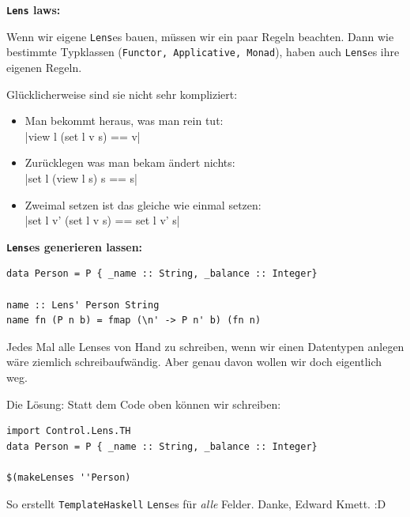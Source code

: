\documentclass{beamer}
\begin{document}

\begin{frame}[fragile]
\textbf{\texttt{Lens} laws:}
\smallskip

Wenn wir eigene \texttt{Lens}es bauen, müssen wir ein paar Regeln beachten. Dann wie bestimmte
Typklassen (\texttt{Functor, Applicative, Monad}), haben auch \texttt{Lens}es ihre eigenen Regeln.\pause
\bigskip

Glücklicherweise sind sie nicht sehr kompliziert:
\begin{itemize}
\item Man bekommt heraus, was man rein tut:\\
|view l (set l v s)  == v|
\pause
\item Zurücklegen was man bekam ändert nichts:\\
|set l (view l s) s  == s|
\pause
\item Zweimal setzen ist das gleiche wie einmal setzen:\\
|set l v' (set l v s) == set l v' s|
\end{itemize}

\end{frame}


\begin{frame}[fragile]

\textbf{\texttt{Lens}es generieren lassen:}\smallskip

\begin{verbatim}
data Person = P { _name :: String, _balance :: Integer}

name :: Lens' Person String
name fn (P n b) = fmap (\n' -> P n' b) (fn n)
\end{verbatim}

Jedes Mal alle Lenses von Hand zu schreiben, wenn wir einen Datentypen anlegen
wäre ziemlich schreibaufwändig. Aber genau davon wollen wir doch eigentlich weg.
\pause

Die Lösung: Statt dem Code oben können wir schreiben:

\begin{verbatim}
import Control.Lens.TH
data Person = P { _name :: String, _balance :: Integer}

$(makeLenses ''Person)
\end{verbatim}

So erstellt \texttt{TemplateHaskell} \texttt{Lens}es für \emph{alle} Felder. Danke, Edward Kmett. :D

\end{frame}
\end{document}
